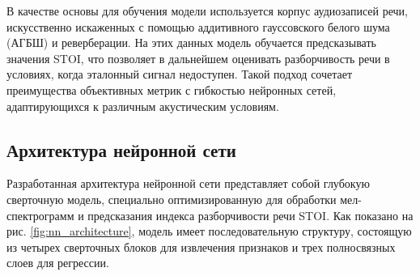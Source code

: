 \documentclass[oneside, final, 14pt]{extarticle}
\begin{document}
В качестве основы для обучения модели используется корпус аудиозаписей речи, искусственно искаженных с помощью аддитивного гауссовского белого шума (АГБШ) и реверберации. На этих данных модель обучается предсказывать значения STOI, что позволяет в дальнейшем оценивать разборчивость речи в условиях, когда эталонный сигнал недоступен. Такой подход сочетает преимущества объективных метрик с гибкостью нейронных сетей, адаптирующихся к различным акустическим условиям.

\subsection{Архитектура нейронной сети}

Разработанная архитектура нейронной сети представляет собой глубокую сверточную модель, специально оптимизированную для обработки мел-спектрограмм и предсказания индекса разборчивости речи STOI. Как показано на рис. \ref{fig:nn_architecture}, модель имеет последовательную структуру, состоящую из четырех сверточных блоков для извлечения признаков и трех полносвязных слоев для регрессии.
\end{document}
